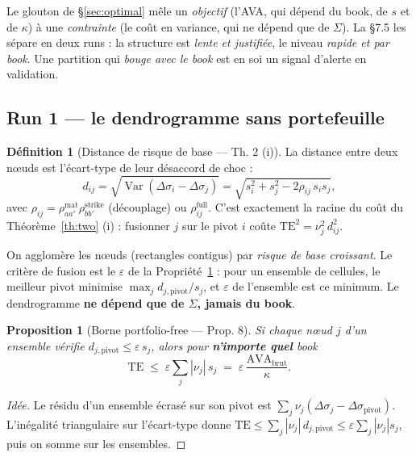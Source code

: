 \documentclass[11pt,a4paper]{article}
\DeclareMathOperator{\Var}{Var}
\newcommand{\dsig}{\Delta\sigma}
\newcommand{\abs}[1]{\left| #1 \right|}
\theoremstyle{plain}
\newtheorem{proposition}[theoreme]{Proposition}
\theoremstyle{definition}
\newtheorem{definition}[theoreme]{Définition}
\theoremstyle{remark}
\begin{document}
Le glouton de \S\ref{sec:optimal} mêle un \emph{objectif} (l'AVA, qui dépend du book,
de $s$ et de $\kappa$) à une \emph{contrainte} (le coût en variance, qui ne dépend que
de $\Sigma$). La \S7.5 les sépare en deux runs : la structure est \emph{lente et
justifiée}, le niveau \emph{rapide et par book}. Une partition qui \emph{bouge avec le
book} est en soi un signal d'alerte en validation.

\subsection{Run 1 --- le dendrogramme sans portefeuille}

\begin{definition}[Distance de risque de base --- Th. 2 (i)]
La distance entre deux nœuds est l'écart-type de leur désaccord de choc :
\begin{equation}
d_{ij} = \sqrt{\Var(\dsig_i - \dsig_j)} = \sqrt{s_i^2 + s_j^2 - 2\rho_{ij}\,s_i s_j},
\label{eq:base-risk}
\end{equation}
avec $\rho_{ij} = \rho^{\mathrm{mat}}_{aa'}\rho^{\mathrm{strike}}_{bb'}$ (découplage) ou
$\rho^{\mathrm{full}}_{ij}$. C'est exactement la racine du coût du Théorème~\ref{th:two}
(i) : fusionner $j$ sur le pivot $i$ coûte $\mathrm{TE}^2 = \nu_j^2\, d_{ij}^2$.
\end{definition}

On agglomère les nœuds (rectangles contigus) par \emph{risque de base croissant}. Le
critère de fusion est le $\varepsilon$ de la Propriété~\ref{prop:prop8} : pour un
ensemble de cellules, le meilleur pivot minimise $\max_j d_{j,\text{pivot}}/s_j$, et
$\varepsilon$ de l'ensemble est ce minimum. Le dendrogramme \textbf{ne dépend que de
$\Sigma$, jamais du book}.

\begin{proposition}[Borne portfolio-free --- Prop. 8]\label{prop:prop8}
Si chaque nœud $j$ d'un ensemble vérifie $d_{j,\text{pivot}} \le \varepsilon\, s_j$,
alors pour \textbf{n'importe quel} book
\begin{equation}
\mathrm{TE} \;\le\; \varepsilon \sum_j \abs{\nu_j}\, s_j
\;=\; \varepsilon\, \frac{\mathrm{AVA}_{\mathrm{brut}}}{\kappa}.
\label{eq:prop8}
\end{equation}
\end{proposition}

\begin{proof}[Idée]
Le résidu d'un ensemble écrasé sur son pivot est $\sum_j \nu_j(\dsig_j -
\dsig_{\text{pivot}})$. L'inégalité triangulaire sur l'écart-type donne
$\mathrm{TE} \le \sum_j \abs{\nu_j}\, d_{j,\text{pivot}} \le \varepsilon\sum_j
\abs{\nu_j} s_j$, puis on somme sur les ensembles.
\end{proof}
\end{document}
